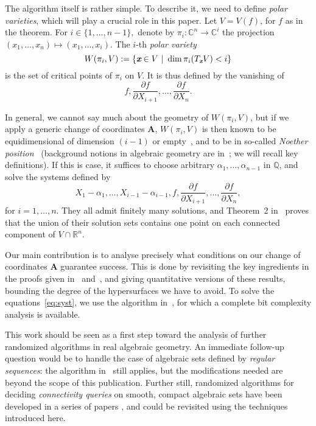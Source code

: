\documentclass[sigconf]{acmart}
\def\mA{{\bm A}}
\def\xb{\textit{\textbf{x}}}
\def\C{\mathbb{C}}
\def\Q{\mathbb{Q}}
\def\R{\mathbb{R}}
\def\pa{\partial}
\begin{document}
The algorithm itself is rather simple. To describe it, we need to
define {\em polar varieties}, which will play a crucial role in this
paper. Let $V=V(f)$, for $f$ as in the theorem. For $i \in
\{1,\hdots,n-1\},$ denote by $\pi_i:\C^n \rightarrow \C^i$ the
projection $(x_1,\hdots,x_n) \mapsto (x_1,\hdots,x_i)$.  The $i$-th
\textit{polar variety} \[W(\pi_i,V) := \{\xb \in V~|~\dim \pi_i(T_\xb
V) < i\}\] is the set of critical points of $\pi_i$ on $V$.  It is
thus defined by the vanishing of \[f,\frac{\pa f}{\pa
  X_{i+1}},\hdots,\frac{\pa f}{\pa X_n}.\]

In general, we cannot say much about the geometry of
$W(\pi_i,V)$, but if we apply a generic change of coordinates $\mA$,
$W(\pi_i,V)$ is then known to be equidimensional of dimension $(i-1)$
or empty~\cite{BaGiHeMb97}, and to be in so-called {\em Noether
  position}~\cite{EMP} (background notions in algebraic geometry are
in~\cite{Mumford76,Shafarevich77,ECA}; we will recall key
definitions). If this is case, it suffices to choose arbitrary
$\alpha_1,\dots,\alpha_{n-1}$ in $\Q$, and solve the systems defined
by
\begin{equation}\label{eq:syst}
X_1-\alpha_1,\dots,X_{i-1}-\alpha_{i-1}, f, \frac{\pa f}{\pa
  X_{i+1}} ,\dots,\frac{\pa f}{\pa X_n},  
\end{equation}
for $i=1,\dots,n$.  They all admit finitely many solutions, and
Theorem~2 in~\cite{EMP} proves that the union of their solution sets
contains one point on each connected component of $V \cap \R^n$.

Our main contribution is to analyse precisely what conditions on our
change of coordinates $\mA$ guarantee success. This is done by
revisiting the key ingredients in the proofs given
in~\cite{BaGiHeMb97} and~\cite{EMP}, and giving quantitative versions
of these results, bounding the degree of the hypersurfaces we have to
avoid.  To solve the equations~\eqref{eq:syst}, we use the algorithm
in~\cite{SH}, for which a complete bit complexity analysis is
available.

This work should be seen as a first step toward the analysis of
further randomized algorithms in real algebraic geometry. An immediate
follow-up question would be to handle the case of algebraic sets
defined by {\em regular sequences}: the algorithm in~\cite{EMP} still
applies, but the modifications needed are beyond the scope of this
publication. Further still, randomized algorithms for deciding {\em
  connectivity queries} on smooth, compact algebraic sets have been
developed in a series of papers
\cite{SchostMohabBabySteps2011,SchostMohabBabySteps2014}, and could be
revisited using the techniques introduced here.
\end{document}
